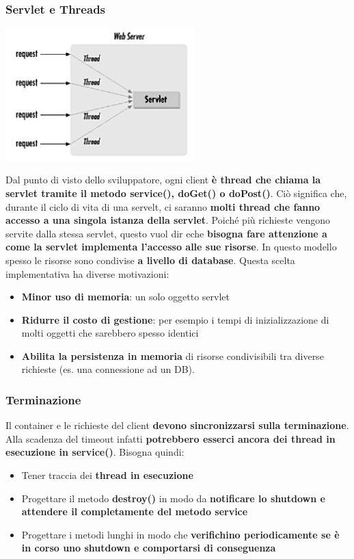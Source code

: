 \documentclass[12pt]{article}
\begin{document}
\subsubsection{Servlet e Threads}
\begin{center}
    \includegraphics[width = 0.55\textwidth]{Images/187.png}
\end{center}
Dal punto di visto dello sviluppatore, ogni client \textbf{è thread che chiama la servlet tramite il metodo service(), doGet() o doPost()}.
Ciò significa che, durante il ciclo di vita di una servelt, ci saranno \textbf{molti thread che fanno accesso a una singola istanza della servlet}.
Poiché più richieste vengono servite dalla stessa servlet, questo vuol dir eche \textbf{bisogna fare attenzione a come la servlet implementa l'accesso alle sue risorse}.
In questo modello spesso le risorse sono condivise \textbf{a livello di database}. Questa scelta implementativa ha diverse motivazioni:
\begin{itemize}
    \item \textbf{Minor uso di memoria}: un solo oggetto servlet
    \item \textbf{Ridurre il costo di gestione}: per esempio i tempi di inizializzazione di molti oggetti che sarebbero spesso identici
    \item \textbf{Abilita la persistenza in memoria} di risorse condivisibili tra diverse richieste (es. una connessione ad un DB).
\end{itemize}
\subsubsection{Terminazione}
Il container e le richieste del client \textbf{devono sincronizzarsi sulla terminazione}. Alla scadenza del timeout infatti \textbf{potrebbero esserci ancora dei thread in esecuzione in service()}.
Bisogna quindi:
\begin{itemize}
    \item Tener traccia dei \textbf{thread in esecuzione}
    \item Progettare il metodo \textbf{destroy()} in modo da \textbf{notificare lo shutdown e attendere il completamente del metodo service}
    \item Progettare i metodi lunghi in modo che \textbf{verifichino periodicamente se è in corso uno shutdown e comportarsi di conseguenza}
\end{itemize}
\end{document}
